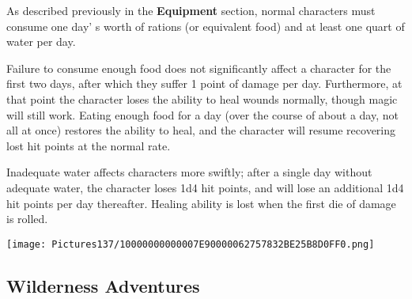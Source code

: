 \documentclass[a4paper,twoside,openany,10pt]{book}
\begin{document}
\begin{multicols}{2}
As described previously in the \textbf{Equipment} section, normal characters must consume one day' s worth of rations (or equivalent food) and at least one quart of water per day.

Failure to consume enough food does not significantly affect a character for the first two days, after which they suffer 1 point of damage per day. Furthermore, at that point the character loses the ability to heal wounds normally, though magic will still work. Eating enough food for a day (over the course of about a day, not all at once) restores the ability to heal, and the character will resume recovering lost hit points at the normal rate.

Inadequate water affects characters more swiftly; after a single day without adequate water, the character loses 1d4 hit points, and will lose an additional 1d4 hit points per day thereafter. Healing ability is lost when the first die of damage is rolled.

\end{multicols}

\vfill

\begin{center}
	\texttt{[image: Pictures137/10000000000007E90000062757832BE25B8D0FF0.png]}
\end{center}

\pagebreak

\subsection{Wilderness Adventures}\label{wilderness-adventures}
\end{document}
